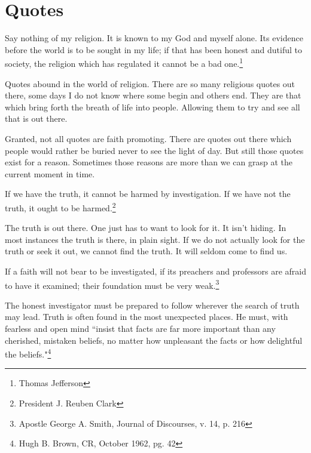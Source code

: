 \chapter{Quotes}

\begin{displayquote}
Say nothing of my religion. It is known to my God and myself alone. Its evidence 
before the world is to be sought in my life; if that has been honest and dutiful 
to society, the religion which has regulated it cannot be a bad one.\footnote{
Thomas Jefferson
}
\end{displayquote}

Quotes abound in the world of religion. There are so many religious quotes out 
there, some days I do not know where some begin and others end. They are that 
which bring forth the breath of life into people. Allowing them to try and see 
all that is out there.

Granted, not all quotes are faith promoting. There are quotes out there which 
people would rather be buried never to see the light of day. But still those 
quotes exist for a reason. Sometimes those reasons are more than we can grasp 
at the current moment in time.

\begin{displayquote}
If we have the truth, it cannot be harmed by investigation. 
If we have not the truth, it ought to be harmed.\footnote{
President J. Reuben Clark}
\end{displayquote}

The truth is out there. One just has to want to look for it. It isn't hiding. 
In most instances the truth is there, in plain sight. If we do not actually 
look for the truth or seek it out, we cannot find the truth. It will seldom 
come to find us.

\begin{displayquote}
If a faith will not bear to be investigated, if its preachers and professors are 
afraid to have it examined; their foundation must be very weak.\footnote{Apostle 
George A. Smith, Journal of Discourses, v. 14, p. 216}
\end{displayquote}

\begin{displayquote}
The honest investigator must be prepared to follow wherever the search of truth 
may lead. Truth is often found in the most unexpected places. He must, with 
fearless and open mind ``insist that facts are far more important than any 
cherished, mistaken beliefs, no matter how unpleasant the facts or how 
delightful the beliefs."\footnote{Hugh B. Brown, CR, October 1962, pg. 42}
\end{displayquote}

